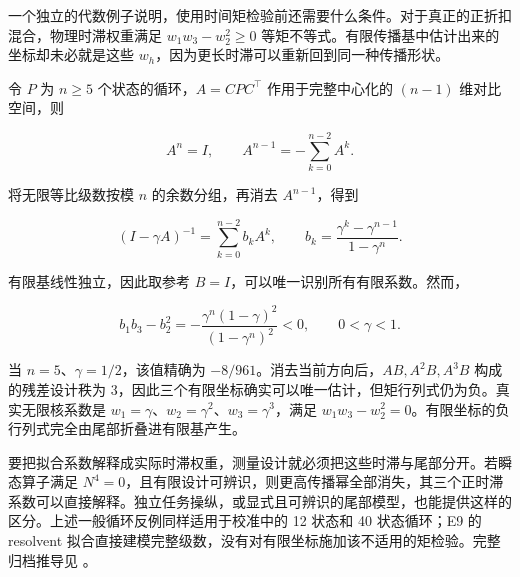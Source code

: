 \documentclass[11pt,a4paper]{article}
\begin{document}
一个独立的代数例子说明，使用时间矩检验前还需要什么条件。对于真正的正折扣混合，物理时滞权重满足
\(w_1w_3-w_2^2\geq0\)
等矩不等式。有限传播基中估计出来的坐标却未必就是这些
\(w_h\)，因为更长时滞可以重新回到同一种传播形状。

\par
\noindent\begin{minipage}{\linewidth}

令 \(P\) 为 \(n\geq5\) 个状态的循环，\(A=CPC^\top\) 作用于完整中心化的
\((n-1)\) 维对比空间，则

\[
A^n=I,
\qquad A^{n-1}=-\sum_{k=0}^{n-2}A^k.
\]

\end{minipage}\par

\par
\noindent\begin{minipage}{\linewidth}

将无限等比级数按模 \(n\) 的余数分组，再消去 \(A^{n-1}\)，得到

\[
(I-\gamma A)^{-1}
=\sum_{k=0}^{n-2}b_kA^k,
\qquad
b_k=\frac{\gamma^k-\gamma^{n-1}}{1-\gamma^n}.
\]

\end{minipage}\par

\par
\noindent\begin{minipage}{\linewidth}

有限基线性独立，因此取参考 \(B=I\)，可以唯一识别所有有限系数。然而，

\[
b_1b_3-b_2^2
=-\frac{\gamma^n(1-\gamma)^2}{(1-\gamma^n)^2}<0,
\qquad 0<\gamma<1.
\]

\end{minipage}\par

当 \(n=5\)、\(\gamma=1/2\)，该值精确为
\(-8/961\)。消去当前方向后，\(AB,A^2B,A^3B\) 构成的残差设计秩为
3，因此三个有限坐标确实可以唯一估计，但矩行列式仍为负。真实无限核系数是
\(w_1=\gamma\)、\(w_2=\gamma^2\)、\(w_3=\gamma^3\)，满足
\(w_1w_3-w_2^2=0\)。有限坐标的负行列式完全由尾部折叠进有限基产生。

要把拟合系数解释成实际时滞权重，测量设计就必须把这些时滞与尾部分开。若瞬态算子满足
\(N^4=0\)，且有限设计可辨识，则更高传播幂全部消失，其三个正时滞系数可以直接解释。独立任务操纵，或显式且可辨识的尾部模型，也能提供这样的区分。上述一般循环反例同样适用于校准中的
12 状态和 40 状态循环；E9 的 resolvent
拟合直接建模完整级数，没有对有限坐标施加该不适用的矩检验。完整归档推导见
。
\end{document}
